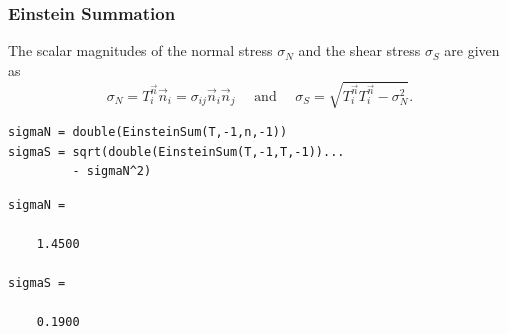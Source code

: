 \begin{frame}[fragile]
  \frametitle{Einstein Summation}

  The scalar magnitudes of the normal stress $\sigma_{N}$ and the shear stress
  $\sigma_{S}$ are given as
  \begin{equation*}
    \sigma_{N} = T^{\vec n}_{i} \vec n_{i} = \sigma_{ij} \vec n_{i}\vec n_{j}
    \quad \text{ and } \quad
    \sigma_{S} =\sqrt{T^{\vec n}_{i}T^{\vec n}_{i} - \sigma^{2}_{N} }.
  \end{equation*}

  \medskip
  \pause

\begin{lstlisting}
sigmaN = double(EinsteinSum(T,-1,n,-1))
sigmaS = sqrt(double(EinsteinSum(T,-1,T,-1))...
         - sigmaN^2)
\end{lstlisting}
\begin{lstlisting}[style=output]
sigmaN =

    1.4500

sigmaS =

    0.1900
\end{lstlisting}

\end{frame}



